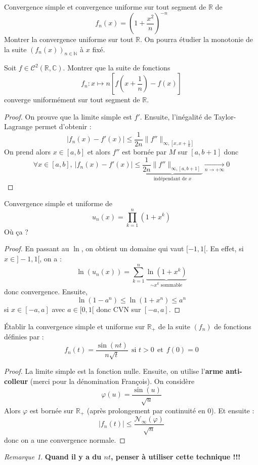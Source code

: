 \documentclass[french,a4paper]{article}
\newcommand{\N}{\mathbb{N}}
\newcommand{\R}{\mathbb{R}}
\newcommand{\C}{\mathbb{C}}
\theoremstyle{plain}
\theoremstyle{definition}
\theoremstyle{remark}
\newtheorem*{rmq}{Remarque}
\begin{document}
\begin{ex}{}
	Convergence simple et convergence uniforme sur tout segment de $\R$ de $$f_n(x)=\displaystyle\left(1+\frac{x^2}{n}\right)^{-n}$$Montrer la convergence uniforme sur tout $\R$. On pourra étudier la monotonie de la suite $(f_n(x))_{n\in\N}$ à $x$ fixé.
\end{ex}

\begin{ex}{}
	Soit $f\in\mathcal{C}^2(\R,\C)$. Montrer que la suite de fonctions $$f_n:x\mapsto n\left[f\left(x+\frac{1}{n}\right)-f(x)\right]$$ converge uniformément sur tout segment de $\R$.
\end{ex}
\begin{proof}
	On prouve que la limite simple est $f'$. Ensuite, l'inégalité de Taylor-Lagrange permet d'obtenir : $$\lvert f_n(x)-f'(x)\rvert\leqslant\frac{1}{2n}\lVert f''\rVert_{\infty,\left[x,x+\frac{1}{n}\right]}$$ On prend alors $x\in[a,b]$ et alors $f''$ est bornée par $M$ sur $[a,b+1]$ donc $$\forall x\in[a,b],\ \lvert f_n(x)-f'(x)\rvert\leqslant\underbrace{\frac{1}{2n}\lVert f''\rVert_{\infty,\left[a,b+1\right]}}_{\text{indépendant de }x}\xrightarrow[n\to+\infty]{}0$$
\end{proof}

\begin{ex}{}
	Convergence simple et uniforme de $$u_n(x)=\prod_{k=1}^{n}(1+x^k)$$ Où ça ?
\end{ex}
\begin{proof}
	En passant au $\ln$, on obtient un domaine qui vaut $[-1,1[$. En effet, si $x\in]-1,1[$, on a : $$\ln(u_n(x))=\sum_{k=1}^{n}\underbrace{\ln(1+x^k)}_{\sim x^k\text{ sommable}}$$ donc convergence. Ensuite, $$\ln(1-a^n)\leqslant\ln(1+x^n)\leqslant a^n$$ si $x\in[-a,a]$ avec $a\in[0,1[$ donc CVN sur $[-a,a]$.
\end{proof}

\begin{ex}{}
	Établir la convergence simple et uniforme sur $\R_+$ de la suite $(f_n)$ de fonctions définies par : $$f_n(t)=\frac{\sin(nt)}{n\sqrt{t}}\ \ \text{si }t>0 \ \ \text{et} \ \ f(0)=0$$
\end{ex}
\begin{proof}
	La limite simple est la fonction nulle. Ensuite, on utilise l'\textbf{arme anti-colleur} (merci pour la dénomination François). On considère $$\varphi(u)=\frac{\sin(u)}{\sqrt{u}}$$ Alors $\varphi$ est bornée sur $\R_+$ (après prolongement par continuité en $0$). Et ensuite : $$\lvert f_n(t)\rvert\leqslant \frac{\mathcal{N}_\infty(\varphi)}{\sqrt{n}}$$ donc on a une convergence normale.
\end{proof}
\begin{rmq}
	\textbf{Quand il y a du $nt$, penser à utiliser cette technique !!!}
\end{rmq}
\end{document}
